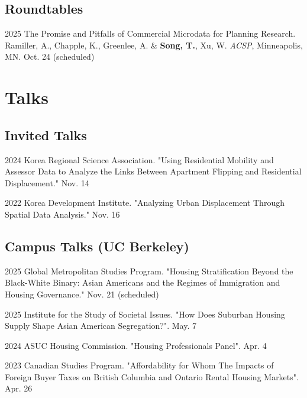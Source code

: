 \documentclass[11pt,letterpaper]{article}
\newcommand{\term}[1]{(#1)}
\begin{document}
\subsection{Roundtables}
\begin{tablist}
  \item[2025] \tab{}The Promise and Pitfalls of Commercial Microdata for Planning Research. Ramiller, A., Chapple, K., Greenlee, A. \& \textbf{Song, T.}, Xu, W. \emph{ACSP}, Minneapolis, MN. Oct. 24 \term{scheduled}
\end{tablist}

\section{Talks}

\subsection{Invited Talks}
\begin{tablist}
  \item[2024] \tab{}Korea Regional Science Association. "Using Residential Mobility and Assessor Data to Analyze the Links Between Apartment Flipping and Residential Displacement." Nov. 14
  \item[2022] \tab{}Korea Development Institute. "Analyzing Urban Displacement Through Spatial Data Analysis." Nov. 16
\end{tablist}

\subsection{Campus Talks (UC Berkeley)} 
\begin{tablist}
  \item[2025] \tab{}Global Metropolitan Studies Program. "Housing Stratification Beyond the Black-White Binary: Asian Americans and the Regimes of Immigration and Housing Governance." Nov. 21 \term{scheduled}
  \item[2025] \tab{}Institute for the Study of Societal Issues. "How Does Suburban Housing Supply Shape Asian American Segregation?". May. 7
  \item[2024] \tab{}ASUC Housing Commission. "Housing Professionals Panel". Apr. 4
  \item[2023] \tab{}Canadian Studies Program. "Affordability for Whom The Impacts of Foreign Buyer Taxes on British Columbia and Ontario Rental Housing Markets". Apr. 26
\end{tablist}
\end{document}

